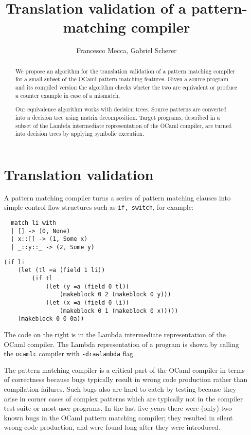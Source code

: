 \documentclass[12pt]{article}
\title{Translation validation of a pattern-matching compiler}
\author{Francesco Mecca, Gabriel Scherer}
\begin{document}
\maketitle

\begin{abstract}
We propose an algorithm for the translation validation of a pattern
matching compiler for a small subset of the OCaml pattern
matching features. Given a source program and its compiled version the
algorithm checks wheter the two are equivalent or produce a counter
example in case of a mismatch.

Our equivalence algorithm works with decision trees. Source patterns are
converted into a decision tree using matrix decomposition.
Target programs, described in a subset of the Lambda intermediate
representation of the OCaml compiler, are turned into decision trees
by applying symbolic execution.
\end{abstract}
\section{Translation validation}
A pattern matching compiler turns a series of pattern matching clauses
into simple control flow structures such as \texttt{if, switch}, for example:

\hspace{-3em}
\begin{minipage}{0.4\linewidth}
\begin{lstlisting}
  match li with
  | [] -> (0, None)
  | x::[] -> (1, Some x)
  | _::y::_ -> (2, Some y)
\end{lstlisting}
\end{minipage}
\hfill
\begin{minipage}{0.6\linewidth}
\begin{lstlisting}
(if li
    (let (tl =a (field 1 li))
        (if tl
            (let (y =a (field 0 tl))
                (makeblock 0 2 (makeblock 0 y)))
            (let (x =a (field 0 li))
                (makeblock 0 1 (makeblock 0 x)))))
    (makeblock 0 0 0a))
\end{lstlisting}
\end{minipage}

The code on the right is in the Lambda intermediate representation of
the OCaml compiler. The Lambda representation of a program is shown by
calling the \texttt{ocamlc} compiler with \texttt{-drawlambda} flag.

The pattern matching compiler is a critical part of the OCaml compiler
in terms of correctness because bugs typically result in wrong code
production rather than compilation failures.
Such bugs also are hard to catch by testing because they arise in
corner cases of complex patterns which are typically not in the
compiler test suite or most user programs.
In the last five years there were (only) two known bugs in the OCaml pattern
matching compiler; they resulted in silent wrong-code production,
and were found long after they were introduced.
\end{document}

